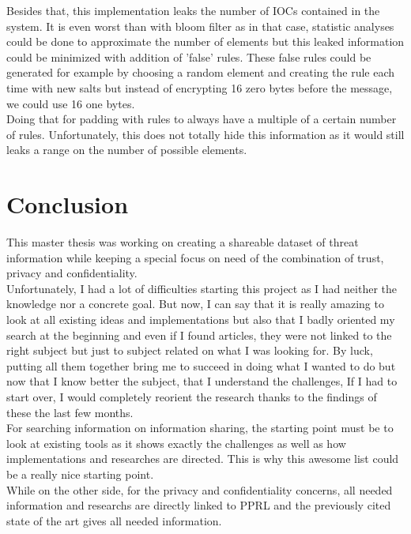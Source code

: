 \documentclass{eplmastersthesis}
\begin{document}
Besides that, this implementation leaks the number of IOCs contained in the system. It is even worst than with bloom filter as in that case, statistic analyses could be done to approximate the number of elements but this leaked information could be minimized with addition of 'false' rules.  These false rules could be generated for example by choosing a random element and creating the rule each time with new salts but instead of encrypting 16 zero bytes before the message, we could use 16 one bytes.\\
Doing that for padding with rules to always have a multiple of a certain number of rules. Unfortunately, this does not totally hide this information as it would still leaks a range on the number of possible elements.



\section{Conclusion}
This master thesis was working on creating a shareable dataset of threat information while keeping a special focus on need of the combination of trust, privacy and confidentiality.\\
Unfortunately, I had a lot of difficulties starting this project as I had neither the knowledge nor a concrete goal. But now, I can say that it is really amazing to look at all existing ideas and implementations but also that I badly oriented my search at the beginning and even if I found articles, they were not linked to the right subject but just to subject related on what I was looking for. By luck, putting all them together bring me to succeed in doing what I wanted to do but now that I know better the subject, that I understand the challenges, If I had to start over, I would completely reorient the research thanks to the findings of these the last few months.\\
For searching information on information sharing, the starting point must be to look at existing tools as it shows exactly the challenges as well as how implementations and researches are directed. This is why this awesome list \cite{AwesomeTreat} could be a really nice starting point.\\
While on the other side, for the privacy and confidentiality concerns, all needed information and researchs are directly linked to PPRL and the previously cited state of the art \cite{vatsalanprivacy} gives all needed information.\\
\end{document}

